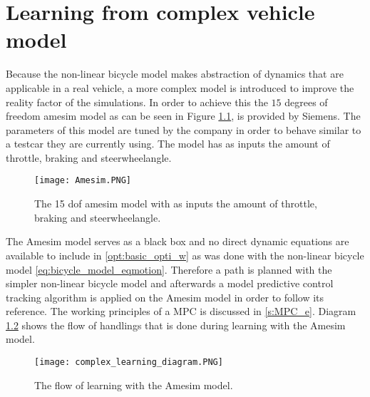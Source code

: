 \chapter{Learning from complex vehicle model}
\label{cha:Tracking_MPC}


Because the non-linear bicycle model makes abstraction of dynamics that are applicable in a real vehicle, a more complex model is introduced to improve the reality factor of the simulations. In order to achieve this the $15$ degrees of freedom amesim model as can be seen in Figure \ref{fig:Amesim}, is provided by Siemens. The parameters of this model are tuned by the company in order to behave similar to a testcar they are currently using. The model has as inputs the amount of throttle, braking and steerwheelangle.  

\begin{figure}[h!]
	\centering
	\texttt{[image: Amesim.PNG]}
	\caption{The 15 dof amesim model with as inputs the amount of throttle, braking and steerwheelangle.}	
	\label{fig:Amesim}
\end{figure}

The Amesim model serves as a black box and no direct dynamic equations are available 
to include in \ref{opt:basic_opti_w} as was done with the non-linear bicycle model \ref{eq:bicycle_model_eqmotion}. Therefore a path is planned with the simpler non-linear bicycle model and afterwards a model predictive control tracking algorithm is applied on the Amesim model in order to follow its reference. The working principles of a MPC is discussed in \ref{s:MPC_e}. Diagram \ref{fig:complex_learning} shows the flow of handlings that is done during learning with the Amesim model.

\begin{figure}[h!]
	\centering
	\texttt{[image: complex\_learning\_diagram.PNG]}
	\caption{The flow of learning with the Amesim model.}	
	\label{fig:complex_learning} 
\end{figure}

